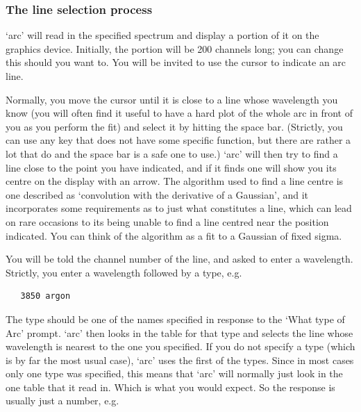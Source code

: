 \documentclass[11pt,twoside]{article}
\begin{document}

\subsubsection{\label{techno10select}The line selection process}

   `arc' will read in the specified spectrum and display a portion of it
   on the graphics device.  Initially, the portion will be 200 channels
   long; you can change this should you want to.  You will be invited to
   use the cursor to indicate an arc line.

   Normally, you move the cursor until it is close to a line whose
   wavelength you know (you will often find it useful to have a hard
   plot of the whole arc in front of you as you perform the fit) and
   select it by hitting the space bar.  (Strictly, you can use any key
   that does not have some specific function, but there are rather a lot
   that do and the space bar is a safe one to use.)  `arc' will then try
   to find a line close to the point you have indicated, and if it finds
   one will show you its centre on the display with an arrow.  The
   algorithm used to find a line centre is one described as `convolution
   with the derivative of a Gaussian', and it incorporates some
   requirements as to just what constitutes a line, which can lead on
   rare occasions to its being unable to find a line centred near the
   position indicated.  You can think of the algorithm as a fit to a
   Gaussian of fixed sigma.

   You will be told the channel number of the line, and asked to enter a
   wavelength.  Strictly, you enter a wavelength followed by a type, e.g.

\begin{verbatim}
   3850 argon
\end{verbatim}

   The type should be one of the names specified in response to the
   `What type of Arc' prompt.  `arc' then looks in the table for that
   type and selects the line whose wavelength is nearest to the one you
   specified. If you do not specify a type (which is by far the most
   usual case), `arc' uses the first of the types.  Since in most cases
   only one type was specified, this means that `arc' will normally just
   look in the one table that it read in.  Which is what you would
   expect.  So the response is usually just a number, e.g.
\end{document}
